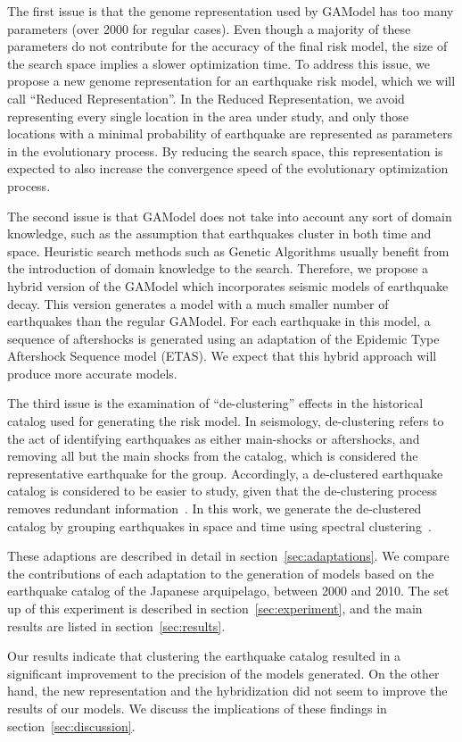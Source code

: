 The first issue is that the genome representation used by GAModel has
too many parameters (over 2000 for regular cases). Even though a
majority of these parameters do not contribute for the accuracy of the
final risk model, the size of the search space implies a slower
optimization time. To address this issue, we propose a new genome
representation for an earthquake risk model, which we will call
``Reduced Representation''. In the Reduced Representation, we avoid
representing every single location in the area under study, and only
those locations with a minimal probability of earthquake are
represented as parameters in the evolutionary process. By reducing the
search space, this representation is expected to also increase the
convergence speed of the evolutionary optimization process.

The second issue is that GAModel does not take into account any sort
of domain knowledge, such as the assumption that earthquakes cluster
in both time and space. Heuristic search methods such as Genetic
Algorithms usually benefit from the introduction of domain knowledge
to the search. Therefore, we propose a hybrid version of the GAModel
which incorporates seismic models of earthquake decay. This version
generates a model with a much smaller number of earthquakes than the
regular GAModel. For each earthquake in this model, a sequence of
aftershocks is generated using an adaptation of the Epidemic Type
Aftershock Sequence model (ETAS). We expect that this hybrid approach
will produce more accurate models.

The third issue is the examination of ``de-clustering'' effects in the
historical catalog used for generating the risk model. In seismology,
de-clustering refers to the act of identifying earthquakes as either
main-shocks or aftershocks, and removing all but the main shocks from
the catalog, which is considered the representative earthquake for the
group. Accordingly, a de-clustered earthquake catalog is considered to
be easier to study, given that the de-clustering process removes
redundant information~\cite{van2012seismicity}. In this work, we
generate the de-clustered catalog by grouping earthquakes in space and
time using spectral clustering~\cite{spectral_tutorial}.

These adaptions are described in detail in
section~\ref{sec:adaptations}. We compare the contributions of each
adaptation to the generation of models based on the earthquake catalog
of the Japanese arquipelago, between 2000 and 2010. The set up of this
experiment is described in section~\ref{sec:experiment},
and the main results are listed in section~\ref{sec:results}.

Our results indicate that clustering the earthquake catalog resulted
in a significant improvement to the precision of the models
generated. On the other hand, the new representation and the
hybridization did not seem to improve the results of our models. We
discuss the implications of these findings in
section~\ref{sec:discussion}.

